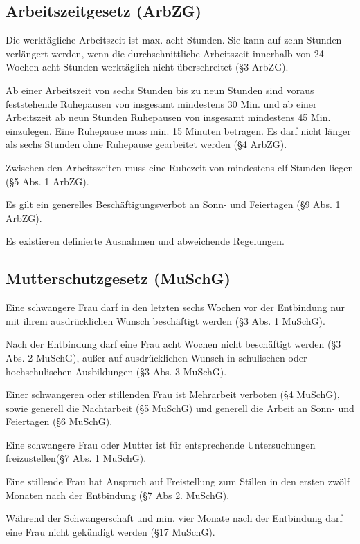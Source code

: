 \subsection{Arbeitszeitgesetz (ArbZG)}

Die werktägliche Arbeitszeit ist max. acht Stunden. Sie kann auf zehn Stunden verlängert werden, wenn die durchschnittliche Arbeitszeit innerhalb von 24 Wochen acht Stunden werktäglich nicht überschreitet (§3 ArbZG).

Ab einer Arbeitszeit von sechs Stunden bis zu neun Stunden sind voraus feststehende Ruhepausen von insgesamt mindestens 30 Min. und ab einer Arbeitszeit ab neun Stunden Ruhepausen von insgesamt mindestens 45 Min. einzulegen. Eine Ruhepause muss min. 15 Minuten betragen. Es darf nicht länger als sechs Stunden ohne Ruhepause gearbeitet werden (§4 ArbZG).

Zwischen den Arbeitszeiten muss eine Ruhezeit von mindestens elf Stunden liegen (§5 Abs. 1 ArbZG).

Es gilt ein generelles Beschäftigungsverbot an Sonn- und Feiertagen (§9 Abs. 1 ArbZG).

Es existieren definierte Ausnahmen und abweichende Regelungen.

\subsection{Mutterschutzgesetz (MuSchG)}

Eine schwangere Frau darf in den letzten sechs Wochen vor der Entbindung nur mit ihrem ausdrücklichen Wunsch beschäftigt werden (§3 Abs. 1 MuSchG).

Nach der Entbindung darf eine Frau acht Wochen nicht beschäftigt werden (§3 Abs. 2 MuSchG), außer auf ausdrücklichen Wunsch in schulischen oder hochschulischen Ausbildungen (§3 Abs. 3 MuSchG).

Einer schwangeren oder stillenden Frau ist Mehrarbeit verboten (§4 MuSchG), sowie generell die Nachtarbeit (§5 MuSchG) und generell die Arbeit an Sonn- und Feiertagen (§6 MuSchG).

Eine schwangere Frau oder Mutter ist für entsprechende Untersuchungen freizustellen(§7 Abs. 1 MuSchG).

Eine stillende Frau hat Anspruch auf Freistellung zum Stillen in den ersten zwölf Monaten nach der Entbindung (§7 Abs 2. MuSchG).

Während der Schwangerschaft und min. vier Monate nach der Entbindung darf eine Frau nicht gekündigt werden (§17 MuSchG).

